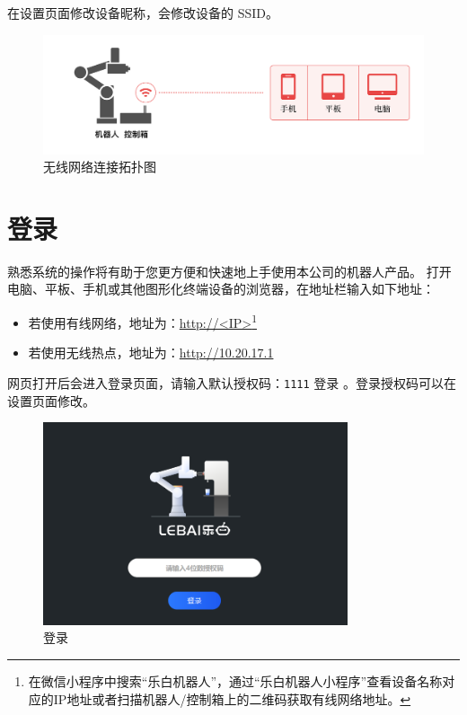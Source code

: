 在设置页面修改设备昵称，会修改设备的 SSID。

\begin{figure}[ht]
    \centering
    \includegraphics[width=\textwidth]{image/network-2.pdf}
    \caption{无线网络连接拓扑图}
    \label{fig:无线网络连接拓扑图}
\end{figure}


\section{登录\LM}
熟悉\LM 系统的操作将有助于您更方便和快速地上手使用本公司的机器人产品。
打开电脑、平板、手机或其他图形化终端设备的浏览器，在地址栏输入如下地址：
\begin{itemize}
	\item 若使用有线网络，地址为：\url{http://<IP>}\footnote{在微信小程序中搜索“乐白机器人”，通过“乐白机器人小程序”查看设备名称对应的IP地址或者扫描机器人/控制箱上的二维码获取有线网络地址。}
	\item 若使用无线热点，地址为：\url{http://10.20.17.1}
\end{itemize}

网页打开后会进入登录页面，请输入默认授权码：\verb|1111| 登录 \LM 。登录授权码可以在设置页面修改。

\begin{figure}[ht]
    \centering
    \includegraphics[width=0.8\textwidth]{screen/2-4.png}
    \caption{登录\LM}
    \label{fig:登录LM}
\end{figure}

